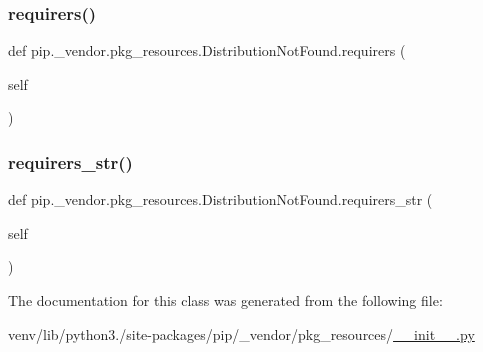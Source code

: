 \subsubsection{\texorpdfstring{requirers()}{requirers()}}
{\footnotesize\ttfamily def pip.\+\_\+vendor.\+pkg\+\_\+resources.\+Distribution\+Not\+Found.\+requirers (\begin{DoxyParamCaption}\item[{}]{self }\end{DoxyParamCaption})}

\mbox{\label{classpip_1_1__vendor_1_1pkg__resources_1_1DistributionNotFound_abaafd40e1852271b6d0abbb81cec2dda}} 
\subsubsection{\texorpdfstring{requirers\+\_\+str()}{requirers\_str()}}
{\footnotesize\ttfamily def pip.\+\_\+vendor.\+pkg\+\_\+resources.\+Distribution\+Not\+Found.\+requirers\+\_\+str (\begin{DoxyParamCaption}\item[{}]{self }\end{DoxyParamCaption})}



The documentation for this class was generated from the following file\+:\begin{DoxyCompactItemize}
\item 
venv/lib/python3./site-\/packages/pip/\+\_\+vendor/pkg\+\_\+resources/\hyperlink{venv_2lib_2python3_89_2site-packages_2pip_2__vendor_2pkg__resources_2____init_____8py}{\+\_\+\+\_\+init\+\_\+\+\_\+.\+py}\end{DoxyCompactItemize}

